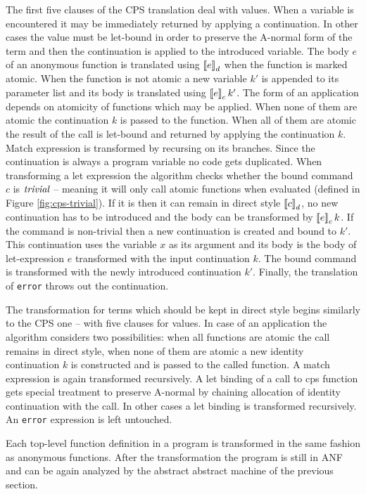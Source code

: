 The first five clauses of the CPS translation deal with values.
When a variable is encountered it may be immediately returned by applying a continuation.
In other cases the value must be let-bound in order to preserve the A-normal form of the term and then the continuation is applied to the introduced variable.
The body $e$ of an anonymous function is translated using $\left\llbracket e \right\rrbracket_d$ when the function is marked atomic.
When the function is not atomic a new variable $k'$ is appended to its parameter list and its body is translated using $\left\llbracket e \right\rrbracket_c k'$.
The form of an application depends on atomicity of functions which may be applied.
When none of them are atomic the continuation $k$ is passed to the function.
When all of them are atomic the result of the call is let-bound and returned by applying the continuation $k$.
Match expression is transformed by recursing on its branches.
Since the continuation is always a program variable no code gets duplicated.
When transforming a let expression the algorithm checks whether the bound command $c$ is $\mathit{trivial}$ -- meaning it will only call atomic functions when evaluated (defined in Figure \ref{fig:cps-trivial}).
If it is then it can remain in direct style $\left\llbracket c \right\rrbracket_d$, no new continuation has to be introduced and the body can be transformed by $\left\llbracket e \right\rrbracket_c k$.
If the command is non-trivial then a new continuation is created and bound to $k'$.
This continuation uses the variable $x$ as its argument and its body is the body of let-expression $e$ transformed with the input continuation $k$.
The bound command is transformed with the newly introduced continuation $k'$.
Finally, the translation of \lstinline!error! throws out the continuation.

The transformation for terms which should be kept in direct style begins similarly to the CPS one -- with five clauses for values.
In case of an application the algorithm considers two possibilities: when all functions are atomic the call remains in direct style, when none of them are atomic a new identity continuation $k$ is constructed and is passed to the called function.
A match expression is again transformed recursively.
A let binding of a call to cps function gets special treatment to preserve A-normal by chaining allocation of identity continuation with the call.
In other cases a let binding is transformed recursively.
An \lstinline!error! expression is left untouched.

Each top-level function definition in a program is transformed in the same fashion as anonymous functions.
After the transformation the program is still in ANF and can be again analyzed by the abstract abstract machine of the previous section. 



